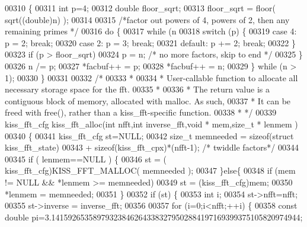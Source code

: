 \begin{DoxyCode}
00310 \{
00311     \textcolor{keywordtype}{int} p=4;
00312     \textcolor{keywordtype}{double} floor\_sqrt;
00313     floor\_sqrt = floor( sqrt((\textcolor{keywordtype}{double})n) );
00314 
00315     \textcolor{comment}{/*factor out powers of 4, powers of 2, then any remaining primes */}
00316     \textcolor{keywordflow}{do} \{
00317         \textcolor{keywordflow}{while} (n %
00318             \textcolor{keywordflow}{switch} (p) \{
00319                 \textcolor{keywordflow}{case} 4: p = 2; \textcolor{keywordflow}{break};
00320                 \textcolor{keywordflow}{case} 2: p = 3; \textcolor{keywordflow}{break};
00321                 \textcolor{keywordflow}{default}: p += 2; \textcolor{keywordflow}{break};
00322             \}
00323             \textcolor{keywordflow}{if} (p > floor\_sqrt)
00324                 p = n;          \textcolor{comment}{/* no more factors, skip to end */}
00325         \}
00326         n /= p;
00327         *facbuf++ = p;
00328         *facbuf++ = n;
00329     \} \textcolor{keywordflow}{while} (n > 1);
00330 \}
00331 
00332 \textcolor{comment}{/*}
00333 \textcolor{comment}{ *}
00334 \textcolor{comment}{ * User-callable function to allocate all necessary storage space for the fft.}
00335 \textcolor{comment}{ *}
00336 \textcolor{comment}{ * The return value is a contiguous block of memory, allocated with malloc.  As such,}
00337 \textcolor{comment}{ * It can be freed with free(), rather than a kiss\_fft-specific function.}
00338 \textcolor{comment}{ * */}
00339 kiss_fft_cfg kiss_fft_alloc(\textcolor{keywordtype}{int} nfft,\textcolor{keywordtype}{int} inverse\_fft,\textcolor{keywordtype}{void} * mem,\textcolor{keywordtype}{size\_t} * lenmem )
00340 \{
00341     kiss_fft_cfg st=NULL;
00342     \textcolor{keywordtype}{size\_t} memneeded = \textcolor{keyword}{sizeof}(\textcolor{keyword}{struct }kiss_fft_state)
00343         + sizeof(kiss\_fft\_cpx)*(nfft-1); \textcolor{comment}{/* twiddle factors*/}
00344 
00345     \textcolor{keywordflow}{if} ( lenmem==NULL ) \{
00346         st = ( kiss_fft_cfg)KISS_FFT_MALLOC( memneeded );
00347     \}\textcolor{keywordflow}{else}\{
00348         \textcolor{keywordflow}{if} (mem != NULL && *lenmem >= memneeded)
00349             st = (kiss_fft_cfg)mem;
00350         *lenmem = memneeded;
00351     \}
00352     \textcolor{keywordflow}{if} (st) \{
00353         \textcolor{keywordtype}{int} i;
00354         st->nfft=nfft;
00355         st->inverse = inverse\_fft;
00356 
00357         \textcolor{keywordflow}{for} (i=0;i<nfft;++i) \{
00358             \textcolor{keyword}{const} \textcolor{keywordtype}{double} pi=3.141592653589793238462643383279502884197169399375105820974944;

\end{DoxyCode}
